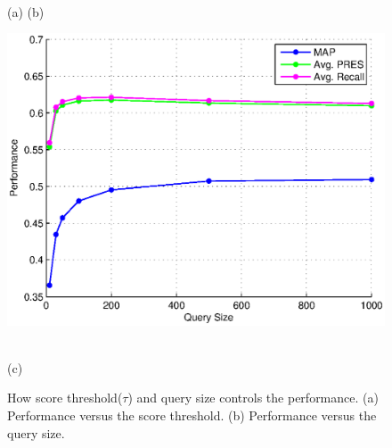 \documentclass{sig-alternate}
\begin{document}
\begin{figure}[htpb]
\begin{center}
\begin{minipage}[b]{0.5\linewidth}
\end{minipage}
\vspace{-3mm}\\
(a) \hspace{30mm}(b)
\hfill
\begin{minipage}[b]{0.5\linewidth}
\includegraphics[width=\linewidth]{figs/opt-query-qsize.eps}
\end{minipage}
\vspace{-3mm}\\
(c)
\caption{\footnotesize
How score threshold($\tau$) and query size controls the performance.
(a) Performance versus the score threshold. (b) Performance versus the query size.}
\label{fig:mom2}
\vspace{-4mm}
\end{center}
\label{fig:control}
\end{figure}
\end{document}
